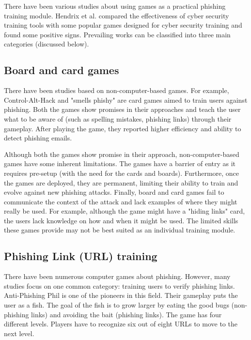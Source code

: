 There have been various studies about using games as a practical phishing training module. Hendrix et al. \cite{hendrix_al_sherbaz_bloom_2016} compared the effectiveness of cyber security training tools with some popular games designed for cyber security training and found some positive signs. Prevailing works can be classified into three main categories (discussed below).

\subsection{Board and card games}
There have been studies based on non-computer-based games. For example, Control-Alt-Hack \cite{control_alt_hack} and "smells phishy" \cite{smels_phishy} are card games aimed to train users against phishing. Both the games show promises in their approaches and teach the user what to be aware of (such as spelling mistakes, phishing links) through their gameplay. After playing the game, they reported higher efficiency and ability to detect phishing emails.

Although both the games show promise in their approach, non-computer-based games have some inherent limitations. The games have a barrier of entry as it requires pre-setup (with the need for the cards and boards). Furthermore, once the games are deployed, they are permanent, limiting their ability to train and evolve against new phishing attacks. Finally, board and card games fail to communicate the context of the attack and lack examples of where they might really be used. For example, although the game might have a "hiding links" card, the users lack knowledge on how and when it might be used. The limited skills these games provide may not be best suited as an individual training module.

\subsection{Phishing Link (URL) training}
There have been numerous computer games about phishing. However, many studies focus on one common category: training users to verify phishing links. Anti-Phishing Phil \cite{anti_phishing_phil} is one of the pioneers in this field. Their gameplay puts the user as a fish. The goal of the fish is to grow larger by eating the good bugs (non-phishing links) and avoiding the bait (phishing links). The game has four different levels. Players have to recognize six out of eight URLs to move to the next level.


